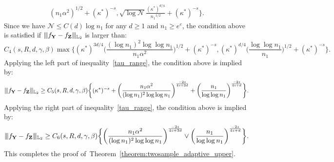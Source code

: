 \documentclass[twoside,11pt]{article}
\newcommand{\Ell}{\mathbb{L}}
\newcommand{\EllTwo}{\Ell_2} %
\newcommand{\vectorize}[1]{\mathbf{#1}}
\newcommand{\dimDensity}{d} %
\newcommand{\sampleSize}{n}
\newcommand{\smoothness}{s}
\newcommand{\ballRadius}{R}
\newcommand{\nTest}{\mathcal{N}} %
\newcommand{\privacyParameter}{\alpha} %
\newcommand{\maxErrorTypeTwo}{\beta} %
\newcommand{\maxErrorTypeOne}{\gamma} %
\newcommand{\binNum}{\kappa}           %
\begin{document}
\begin{appendix}
\begin{align*}
{		}{
			(\sampleSize_1 \privacyParameter^2)^{1/2}
		} 
		+(\binNum^\ast)^{-\smoothness}
		,
		\sqrt{\log{\nTest}}
		\frac{
			(\binNum^\ast)^{\dimDensity/4}
		}{
			{\sampleSize_1}^{1/2}
		}	+(\binNum^\ast)^{-\smoothness}
		\biggr\}.
	\end{align*}
	Since we have $\mathcal{N} \leq C(\dimDensity) \log \sampleSize_1$
	for any $\dimDensity \geq 1$
	and
	$\sampleSize_1 \geq e^e$, the condition above is satisfied if $	\vert\kern-0.25ex
	\vert\kern-0.25ex
	\vert
	f_{\vectorize{Y}} - f_{\vectorize{Z}}
	\vert\kern-0.25ex
	\vert\kern-0.25ex
	\vert_{\EllTwo}$ is larger than:
	\begin{equation*}
		C_4 (\smoothness, \ballRadius, \dimDensity, \maxErrorTypeOne, \maxErrorTypeTwo) \max
		\biggl\{
		(\binNum^\ast)^{3\dimDensity/4}
		\biggl(
		\frac{
			(\log{\sampleSize_1})^2
			\log{\log \sampleSize_1}
		}{
			\sampleSize_1 \privacyParameter^2
		}
		\biggr)^{1/2}
		+	(\binNum^\ast)^{-\smoothness}
		,
		(\binNum^\ast)^{\dimDensity/4}
		\biggl(
		\frac{
			\log{\log \sampleSize_1}
		}{
			{\sampleSize_1}
		}
		\biggr)^{1/2}+	(\binNum^\ast)^{-\smoothness}
		\biggr\}	.
	\end{equation*}
	Applying the left part of inequality~\eqref{tau_range}, the condition above is implied by:
	\begin{equation*}%
		\vert\kern-0.25ex
		\vert\kern-0.25ex
		\vert
		f_{\vectorize{Y}} - f_{\vectorize{Z}}
		\vert\kern-0.25ex
		\vert\kern-0.25ex
		\vert_{\EllTwo}
		\geq
		C_5 (\smoothness, \ballRadius, \dimDensity, \maxErrorTypeOne, \maxErrorTypeTwo)
		\biggl\{
		(\binNum^\ast)^{-\smoothness}
		+
		\biggl(
		\frac{ \sampleSize_1 \privacyParameter^2
		}{
			(\log{\sampleSize_1})^2
			\log{\log \sampleSize_1}
		}
		\biggr)^{\frac{-2\smoothness}{4\smoothness+3\dimDensity}}
		+
		\biggl(
		\frac{
			\sampleSize_1
		}{
			\log{\log \sampleSize_1}
		}
		\biggr)^{
			\frac{-2\smoothness}{4\smoothness+\dimDensity}
		}
		\biggr\}.
	\end{equation*}
	Applying the right part of inequality~\eqref{tau_range}, the condition above is implied by:
	\begin{equation*}%
		\vert\kern-0.25ex
		\vert\kern-0.25ex
		\vert
		f_{\vectorize{Y}} - f_{\vectorize{Z}}
		\vert\kern-0.25ex
		\vert\kern-0.25ex
		\vert_{\EllTwo}
		\geq
		C_6 (\smoothness, \ballRadius, \dimDensity, \maxErrorTypeOne, \maxErrorTypeTwo)
		\biggl\{
		\biggl(
		\frac{ \sampleSize_1 \privacyParameter^2
		}{
			(\log{\sampleSize_1})^2
			\log{\log \sampleSize_1}
		}
		\biggr)^{\frac{-2\smoothness}{4\smoothness+3\dimDensity}}
		\vee
		\biggl(
		\frac{
			\sampleSize_1
		}{
			\log{\log \sampleSize_1}
		}
		\biggr)^{
			\frac{-2\smoothness}{4\smoothness+\dimDensity}
		}
		\biggr\}.
	\end{equation*}
	This completes the proof of~Theorem~\ref{theorem:twosample_adaptive_upper}.

\end{appendix}
\end{document}
